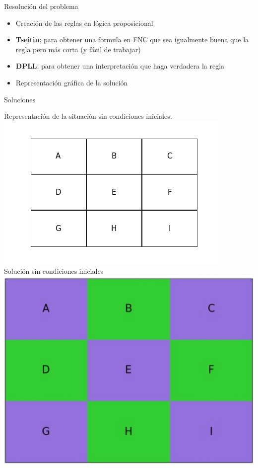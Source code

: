 \documentclass[10pt]{beamer}
\begin{document}
\begin{frame}{Resolución del problema}
\begin{itemize}
\item Creación de las reglas en lógica proposicional
\item \textbf{Tseitin}: para obtener una formula en FNC que sea igualmente buena que la regla pero más corta (y fácil de trabajar)
\item \textbf{DPLL}: para obtener una interpretación que haga verdadera la regla
\item Representación gráfica de la solución

\end{itemize}
\end{frame}
\begin{frame}{Soluciones}
\begin{multicols}{2}
Representación de la situación sin condiciones iniciales.
\center
\includegraphics[scale=0.40]{Images/Mapa3.png} \\
Solución sin condiciones iniciales \\
\center
\includegraphics[scale=0.35]{Images/SinConIni.png}
\end{multicols}
\end{frame}
\end{document}
